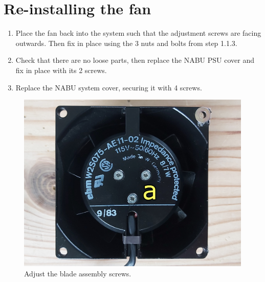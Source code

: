 \section{Re-installing the fan}
\begin{enumerate}
	\item Place the fan back into the system such that the adjustment screws are facing outwards. Then fix in place using the 3 nuts and bolts from step 1.1.3.
	\item Check that there are no loose parts, then replace the NABU PSU cover and fix in place with its 2 screws.
	\item Replace the NABU system cover, securing it with 4 screws.
\end{enumerate}
\newpage
\begin{figure}[h!]
	\includegraphics[width=\columnwidth]{images/fan-image-1.jpg}
	\caption{Adjust the blade assembly screws.}
	\label{fig:fanassembly}
\end{figure}
